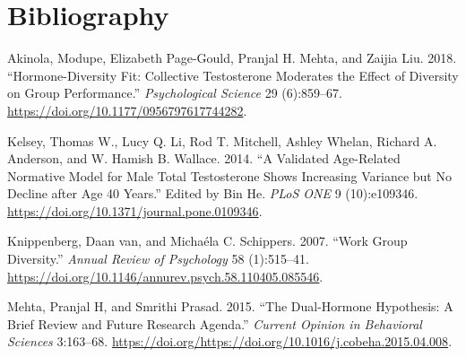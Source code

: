 \documentclass[]{article}
\begin{document}
\hypertarget{bibliography}{%
\section*{Bibliography}\label{bibliography}}

\hypertarget{refs}{}
\leavevmode\hypertarget{ref-Akinola2018}{}%
Akinola, Modupe, Elizabeth Page-Gould, Pranjal H. Mehta, and Zaijia Liu.
2018. ``Hormone-Diversity Fit: Collective Testosterone Moderates the
Effect of Diversity on Group Performance.'' \emph{Psychological Science}
29 (6):859--67. \url{https://doi.org/10.1177/0956797617744282}.

\leavevmode\hypertarget{ref-Kelsey2014}{}%
Kelsey, Thomas W., Lucy Q. Li, Rod T. Mitchell, Ashley Whelan, Richard
A. Anderson, and W. Hamish B. Wallace. 2014. ``A Validated Age-Related
Normative Model for Male Total Testosterone Shows Increasing Variance
but No Decline after Age 40 Years.'' Edited by Bin He. \emph{PLoS ONE} 9
(10):e109346. \url{https://doi.org/10.1371/journal.pone.0109346}.

\leavevmode\hypertarget{ref-vanK}{}%
Knippenberg, Daan van, and Michaéla C. Schippers. 2007. ``Work Group
Diversity.'' \emph{Annual Review of Psychology} 58 (1):515--41.
\url{https://doi.org/10.1146/annurev.psych.58.110405.085546}.

\leavevmode\hypertarget{ref-MEHTA2015163}{}%
Mehta, Pranjal H, and Smrithi Prasad. 2015. ``The Dual-Hormone
Hypothesis: A Brief Review and Future Research Agenda.'' \emph{Current
Opinion in Behavioral Sciences} 3:163--68.
\url{https://doi.org/https://doi.org/10.1016/j.cobeha.2015.04.008}.
\end{document}
